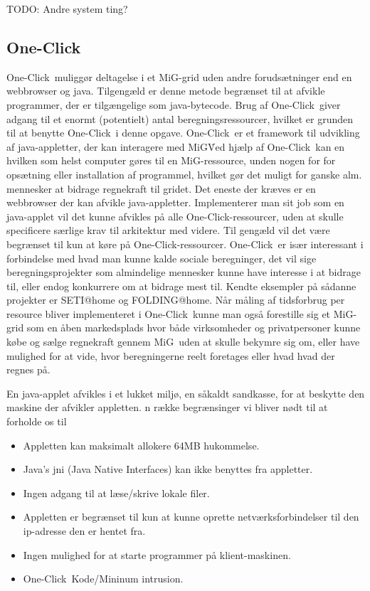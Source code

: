 \documentclass[draft,a4paper,10pt]{article}
\newcommand{\mig}{MiG}
\newcommand{\oc}{One-Click}
\begin{document}
TODO: Andre system ting?

\subsection{\oc}\label{applet}
\oc\ muliggør deltagelse i et \mig-grid uden andre forudsætninger end en webbrowser og java. Tilgengæld er denne metode begrænset til at afvikle programmer, der er tilgængelige som java-bytecode. Brug af \oc\ giver adgang til et enormt (potentielt) antal beregningsressourcer, hvilket er grunden til at benytte \oc\ i denne opgave.
\oc\ er et framework til udvikling af java-appletter, der kan interagere med \mig\. Ved hjælp af \oc\ kan en hvilken som helst computer gøres til en \mig-ressource, unden nogen for for opsætning eller installation af programmel, hvilket gør det muligt for ganske alm. mennesker at bidrage regnekraft til gridet. Det eneste der kræves er en webbrowser der kan afvikle java-appletter. Implementerer man sit job som en java-applet vil det kunne afvikles på alle \oc-ressourcer, uden at skulle specificere særlige krav til arkitektur med videre. Til gengæld vil det være begrænset til kun at køre på \oc-ressourcer. 
\oc\ er især interessant i forbindelse med hvad man kunne kalde sociale beregninger, det vil sige beregningsprojekter som almindelige mennesker kunne have interesse i at bidrage til, eller endog konkurrere om at bidrage mest til. Kendte eksempler på sådanne projekter er SETI@home og FOLDING@home. Når måling af tidsforbrug per resource bliver implementeret i \oc\ kunne man også  forestille sig et \mig-grid som en åben markedsplads hvor både virksomheder og privatpersoner kunne købe og sælge regnekraft gennem \mig\ uden at skulle bekymre sig om, eller have mulighed for at vide, hvor beregningerne reelt foretages eller hvad hvad der regnes på. 


En java-applet afvikles i et lukket miljø, en såkaldt sandkasse, for at beskytte den maskine der afvikler appletten. n række begrænsinger vi bliver nødt til at forholde os til
\begin{itemize}
	\item Appletten kan maksimalt allokere 64MB hukommelse.
	\item Java's jni (Java Native Interfaces) kan ikke benyttes fra appletter. 
	\item Ingen adgang til at læse/skrive lokale filer.
	\item Appletten er begrænset til kun at kunne oprette netværksforbindelser til den ip-adresse den er hentet fra.
	\item Ingen mulighed for at starte programmer på klient-maskinen.
	\item \oc\ Kode/Mininum intrusion.
\end{itemize}
\end{document}
